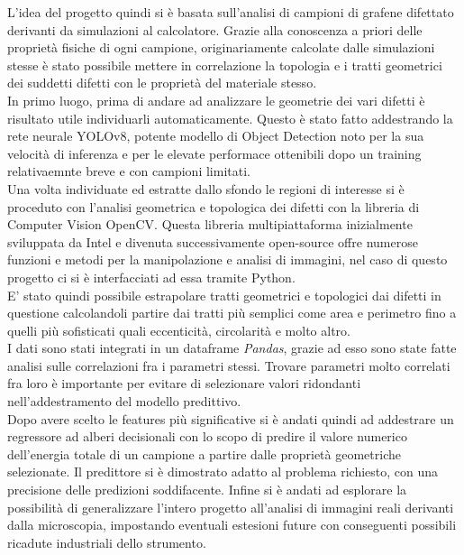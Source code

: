 \documentclass[12pt,a4paper,openright,twoside]{report}
\begin{document}
L'idea del progetto quindi si è basata sull'analisi di campioni di grafene difettato derivanti da simulazioni al calcolatore. Grazie alla conoscenza a priori delle proprietà fisiche di ogni campione, originariamente calcolate dalle simulazioni stesse è stato possibile mettere in correlazione la topologia e i tratti geometrici dei suddetti difetti con le proprietà del materiale stesso.\\
In primo luogo, prima di andare ad analizzare le geometrie dei vari difetti è risultato utile individuarli automaticamente. 
Questo è stato fatto addestrando la rete neurale YOLOv8, potente modello di Object Detection noto per la sua velocità di inferenza e per le elevate performace ottenibili dopo un training relativaemnte breve e con campioni limitati.\\
Una volta individuate ed estratte dallo sfondo le regioni di interesse si è proceduto con l'analisi geometrica e topologica dei difetti con la libreria di Computer Vision OpenCV.
Questa libreria multipiattaforma inizialmente sviluppata da Intel e divenuta successivamente open-source offre numerose funzioni e metodi per la manipolazione e analisi di immagini, nel caso di questo progetto ci si è interfacciati ad essa tramite Python. \\
E' stato quindi possibile estrapolare tratti geometrici e topologici dai difetti in questione calcolandoli  partire dai tratti più semplici come area e perimetro fino a quelli più sofisticati quali eccenticità, circolarità e molto altro.\\
I dati sono stati integrati in un dataframe \emph{Pandas}, grazie ad esso sono state fatte analisi sulle correlazioni fra i parametri stessi. Trovare parametri molto correlati fra loro è importante per evitare di selezionare valori ridondanti nell'addestramento del modello predittivo.\\
Dopo avere scelto le features più significative si è andati quindi ad addestrare un regressore ad alberi decisionali con lo scopo di predire il valore numerico dell'energia totale di un campione a partire dalle proprietà geometriche selezionate. Il predittore si è dimostrato adatto al problema richiesto, con una precisione delle predizioni soddifacente.
Infine si è andati ad esplorare la possibilità di generalizzare l'intero progetto all'analisi di immagini reali derivanti dalla microscopia, impostando eventuali estesioni future con conseguenti possibili ricadute industriali dello strumento. 
\clearpage{\pagestyle{empty}\cleardoublepage}
\rhead[\fancyplain{}{\bfseries\leftmark}]{\fancyplain{}{\bfseries\thepage}}
\end{document}
